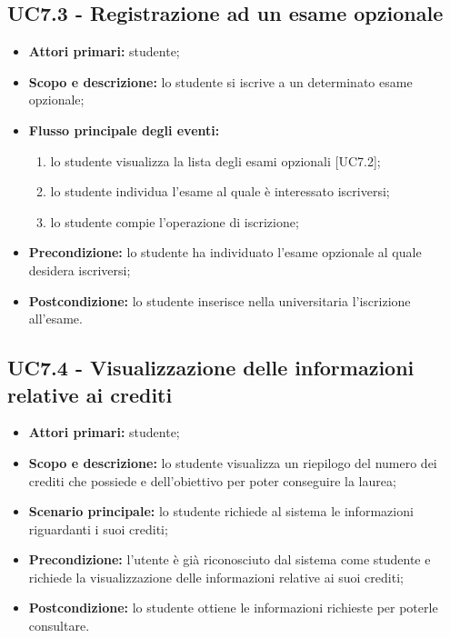 \documentclass[AnalisiDeiRequisiti.tex]{subfiles}
\begin{document}
\subsection{UC7.3 - Registrazione ad un esame opzionale}
\begin{itemize}
	\item \textbf{Attori primari:} studente;\\
	\item \textbf{Scopo e descrizione:} lo studente si iscrive a un determinato esame opzionale;\\
	\item \textbf{Flusso principale degli eventi:}\\
	\begin{enumerate}
		\item lo studente visualizza la lista degli esami opzionali [UC7.2];
		\item lo studente individua l'esame al quale è interessato iscriversi;
		\item lo studente compie l'operazione di iscrizione;
	\end{enumerate}
	\item \textbf{Precondizione:} lo studente ha individuato l'esame opzionale al quale desidera iscriversi;\\
	\item \textbf{Postcondizione:} lo studente inserisce nella  universitaria l'iscrizione all'esame.\\
\end{itemize}

\subsection{UC7.4 - Visualizzazione delle informazioni relative ai crediti}
\begin{itemize}
	\item \textbf{Attori primari:} studente;\\
	\item \textbf{Scopo e descrizione:} lo studente visualizza un riepilogo del numero dei crediti che possiede e dell'obiettivo per poter conseguire la laurea;\\
	\item \textbf{Scenario principale:} lo studente richiede al sistema le informazioni riguardanti i suoi crediti;\\
	\item \textbf{Precondizione:} l'utente è già riconosciuto dal sistema come studente e richiede la visualizzazione delle informazioni relative ai suoi crediti;\\
	\item \textbf{Postcondizione:} lo studente ottiene le informazioni richieste per poterle consultare.\\
\end{itemize}
\end{document}
